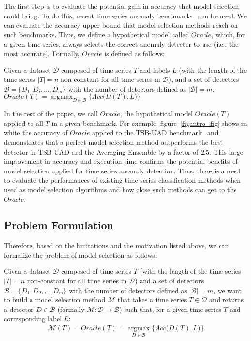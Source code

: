 The first step is to evaluate the potential gain in accuracy that model selection could bring. To do this, recent time series anomaly benchmarks~\cite{10.14778/3529337.3529354,10.14778/3538598.3538602} can be used. We can evaluate the accuracy upper bound that model selection methods reach on such benchmarks. Thus, we define a hypothetical model called $Oracle$, which, for a given time series, always selects the correct anomaly detector to use (i.e., the most accurate). Formally, $Oracle$ is defined as follows:

\begin{definition}
Given a dataset $\mathcal{D}$ composed of time series $T$ and labels $L$ (with the length of the time series $|T|=n$ non-constant for all time series in $\mathcal{D}$), and a set of detectors $\mathcal{B} = \{D_1, D_i, ..., D_m\}$ with the number of detectors defined as $|\mathcal{B}|=m$, $Oracle(T)= \operatorname*{argmax}_{D \in \mathcal{B}} \big\{Acc\big(D(T),L\big)\big\}$ 
\end{definition}

In the rest of the paper, we call $Oracle$, the hypothetical model $Oracle(T)$ applied to all $T$ in a given benchmark. For example, figure~\ref{fig:intro_fig} shows in white the accuracy of $Oracle$ applied to the TSB-UAD benchmark~\cite{10.14778/3529337.3529354} and demonstrates that a perfect model selection method outperforms the best detector in TSB-UAD and the Averaging Ensemble by a factor of 2.5. This large improvement in accuracy and execution time confirms the potential benefits of model selection applied for time series anomaly detection. Thus, there is a need to evaluate the performances of existing time series classification methods when used as model selection algorithms and how close such methods can get to the $Oracle$.

\subsection{Problem Formulation}

Therefore, based on the limitations and the motivation listed above, we can formalize the problem of model selection as follows:

\begin{problem}
    \label{prob:probdef}
    Given a dataset $\mathcal{D}$ composed of time series $T$ (with the length of the time series $|T|=n$ non-constant for all time series in $\mathcal{D}$) and a set of detectors $\mathcal{B} = \{D_1, D_2, ..., D_m\}$ with the number of detectors defined as $|\mathcal{B}|=m$, we want to build a model selection method $\mathcal{M}$ that takes a time series $T\in \mathcal{D}$ and returns a detector $D\in \mathcal{B}$ (formally $\mathcal{M}: \mathcal{D} \rightarrow \mathcal{B}$) such that, for a given time series $T$ and corresponding label $L$:
    \begin{align*}
        \mathcal{M}(T) = Oracle(T)= \operatorname*{argmax}_{D \in \mathcal{B}} \bigg\{Acc\big(D(T),L\big)\bigg\}
    \end{align*}
\end{problem}

